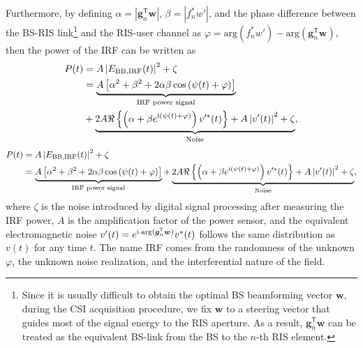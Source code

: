 \documentclass[journal,twocolumn]{IEEEtran}
\theoremstyle{nonumberplain}
\def \T {\bm \Theta}
\def \arg {\text{arg}}
\def \T {^{\mathsf{T}}}
\def \ri {{\rm i}}
\begin{document}
    Furthermore, by defining $\alpha = \left\vert\bm g_{n}\T\bm w\right\vert$, $\beta = \left\vert f_{n}^{*} w' \right\vert$, and the phase difference between the \ac{BS}-RIS link\footnote{Since it is usually difficult to obtain the optimal BS beamforming vector $\bm w$, during the CSI acquisition procedure, we fix $\bm w$ to a steering vector that guides most of the signal energy to the RIS aperture. As a result, $\bm g_n\T \bm w$ can be treated as the equivalent BS-link from the BS to the $n$-th RIS element.} and the RIS-user channel as $\varphi = \arg\left(f_{n}^{*}w'\right)-\arg\left(\bm g_{n}\T\bm w\right)$, then the power of the \ac{IRF} can be written as
    \ifx\onecol\undefined
        \begin{equation}
            \label{eqn:power of interference}
            \begin{aligned}
                P(t)&=A \left| E_{{\rm BB, IRF}} (t)\right |^{2}+\zeta\\
                &=\underbrace{A\left[\alpha^{2}+\beta^{2}+2\alpha\beta\cos\left(\psi(t)+\varphi\right)\right]}_{\text{IRF power signal}}\\
                &+\underbrace{2A\Re\left\{\left(\alpha+\beta e^{\ri\left(\psi(t)+\varphi\right)}\right)v'^{*}(t)\right\}+A\left|v'(t)\right|^{2}+\zeta}_{\text{Noise}},\\
            \end{aligned}
        \end{equation}
    \else 
        \begin{equation}
            \label{eqn:power of interference}
            \begin{aligned}
                P(t)&=A \left| E_{{\rm BB, IRF}} (t)\right |^{2}+\zeta\\
                &=\underbrace{A\left[\alpha^{2}+\beta^{2}+2\alpha\beta\cos\left(\psi(t)+\varphi\right)\right]}_{\text{IRF power signal}}+\underbrace{2A\Re\left\{\left(\alpha+\beta e^{\ri\left(\psi(t)+\varphi\right)}\right)v'^{*}(t)\right\}+A\left|v'(t)\right|^{2}+\zeta}_{\text{Noise}},\\
            \end{aligned}
        \end{equation}
    \fi
    where $\zeta$ is the noise introduced by digital signal processing after measuring the IRF power, $A$ is the amplification factor of the power sensor, and the equivalent electromagnetic noise $v'(t) = e^{\ri\cdot{\rm arg}({\bm g}_n\T \bm w)}v^*(t)$ follows the same distribution as $v(t)$ for any time $t$.
    The name IRF comes from the randomness of the unknown $\varphi$, the unknown noise realization, and the interferential nature of the field.
\end{document}
